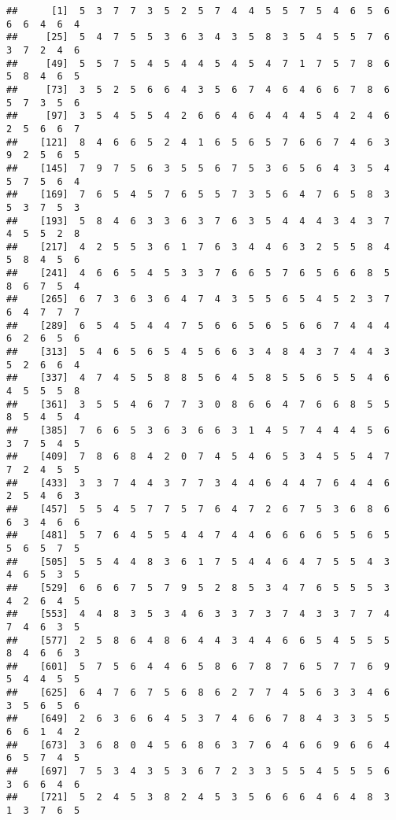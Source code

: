 \documentclass[
]{book}
\begin{document}
\begin{verbatim}
##      [1]  5  3  7  7  3  5  2  5  7  4  4  5  5  7  5  4  6  5  6  6  6  4  6  4
##     [25]  5  4  7  5  5  3  6  3  4  3  5  8  3  5  4  5  5  7  6  3  7  2  4  6
##     [49]  5  5  7  5  4  5  4  4  5  4  5  4  7  1  7  5  7  8  6  5  8  4  6  5
##     [73]  3  5  2  5  6  6  4  3  5  6  7  4  6  4  6  6  7  8  6  5  7  3  5  6
##     [97]  3  5  4  5  5  4  2  6  6  4  6  4  4  4  5  4  2  4  6  2  5  6  6  7
##    [121]  8  4  6  6  5  2  4  1  6  5  6  5  7  6  6  7  4  6  3  9  2  5  6  5
##    [145]  7  9  7  5  6  3  5  5  6  7  5  3  6  5  6  4  3  5  4  5  7  5  6  4
##    [169]  7  6  5  4  5  7  6  5  5  7  3  5  6  4  7  6  5  8  3  5  3  7  5  3
##    [193]  5  8  4  6  3  3  6  3  7  6  3  5  4  4  4  3  4  3  7  4  5  5  2  8
##    [217]  4  2  5  5  3  6  1  7  6  3  4  4  6  3  2  5  5  8  4  5  8  4  5  6
##    [241]  4  6  6  5  4  5  3  3  7  6  6  5  7  6  5  6  6  8  5  8  6  7  5  4
##    [265]  6  7  3  6  3  6  4  7  4  3  5  5  6  5  4  5  2  3  7  6  4  7  7  7
##    [289]  6  5  4  5  4  4  7  5  6  6  5  6  5  6  6  7  4  4  4  6  2  6  5  6
##    [313]  5  4  6  5  6  5  4  5  6  6  3  4  8  4  3  7  4  4  3  5  2  6  6  4
##    [337]  4  7  4  5  5  8  8  5  6  4  5  8  5  5  6  5  5  4  6  4  5  5  5  8
##    [361]  3  5  5  4  6  7  7  3  0  8  6  6  4  7  6  6  8  5  5  8  5  4  5  4
##    [385]  7  6  6  5  3  6  3  6  6  3  1  4  5  7  4  4  4  5  6  3  7  5  4  5
##    [409]  7  8  6  8  4  2  0  7  4  5  4  6  5  3  4  5  5  4  7  7  2  4  5  5
##    [433]  3  3  7  4  4  3  7  7  3  4  4  6  4  4  7  6  4  4  6  2  5  4  6  3
##    [457]  5  5  4  5  7  7  5  7  6  4  7  2  6  7  5  3  6  8  6  6  3  4  6  6
##    [481]  5  7  6  4  5  5  4  4  7  4  4  6  6  6  6  5  5  6  5  5  6  5  7  5
##    [505]  5  5  4  4  8  3  6  1  7  5  4  4  6  4  7  5  5  4  3  4  6  5  3  5
##    [529]  6  6  6  7  5  7  9  5  2  8  5  3  4  7  6  5  5  5  3  4  2  6  4  5
##    [553]  4  4  8  3  5  3  4  6  3  3  7  3  7  4  3  3  7  7  4  7  4  6  3  5
##    [577]  2  5  8  6  4  8  6  4  4  3  4  4  6  6  5  4  5  5  5  8  4  6  6  3
##    [601]  5  7  5  6  4  4  6  5  8  6  7  8  7  6  5  7  7  6  9  5  4  4  5  5
##    [625]  6  4  7  6  7  5  6  8  6  2  7  7  4  5  6  3  3  4  6  3  5  6  5  6
##    [649]  2  6  3  6  6  4  5  3  7  4  6  6  7  8  4  3  3  5  5  6  6  1  4  2
##    [673]  3  6  8  0  4  5  6  8  6  3  7  6  4  6  6  9  6  6  4  6  5  7  4  5
##    [697]  7  5  3  4  3  5  3  6  7  2  3  3  5  5  4  5  5  5  6  3  6  6  4  6
##    [721]  5  2  4  5  3  8  2  4  5  3  5  6  6  6  4  6  4  8  3  1  3  7  6  5

\end{verbatim}
\end{document}
